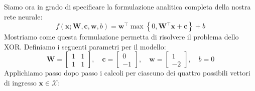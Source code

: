 ﻿\documentclass[11pt, a4paper]{article}
\begin{document}

Siamo ora in grado di specificare la formulazione analitica completa della nostra rete neurale:
\[
f(\bm{x}; \bm{W}, \bm{c}, \bm{w}, b) = \bm{w}^\top \max\left\{0, \bm{W}^\top \bm{x} + \bm{c}\right\} + b
\]
Mostriamo come questa formulazione permetta di risolvere il problema dello XOR. Definiamo i seguenti parametri per il modello:
\[
\bm{W} = \begin{bmatrix} 1 & 1 \\ 1 & 1 \end{bmatrix}, \quad \bm{c} = \begin{bmatrix} 0 \\ -1 \end{bmatrix}, \quad \bm{w} = \begin{bmatrix} 1 \\ -2 \end{bmatrix}, \quad b = 0
\]
Applichiamo passo dopo passo i calcoli per ciascuno dei quattro possibili vettori di ingresso $\bm{x} \in \mathcal{X}$:
\end{document}
